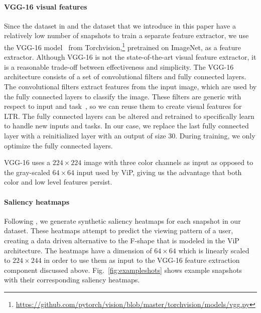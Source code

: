 \paragraph{VGG-16 visual features}
Since the dataset in \citep{fan2017learning} and the \datasetname{} dataset that we introduce in this paper have a relatively low number of snapshots to train a separate feature extractor, we use the VGG-16 model~\cite{simonyan2014very} from Torchvision,\footnote{\url{https://github.com/pytorch/vision/blob/master/torchvision/models/vgg.py}} pretrained on ImageNet, as a feature extractor. 
Although VGG-16 is not the state-of-the-art visual feature extractor, it is a reasonable trade-off between effectiveness and simplicity.
The VGG-16 architecture consists of a set of convolutional filters and fully connected layers. 
The convolutional filters extract features from the input image, which are used by the fully connected layers to classify the image. 
These filters are generic with respect to input and task~\citep{donahue2014decaf}, so we can reuse them to create visual features for LTR. 
The fully connected layers can be altered and retrained to specifically learn to handle new inputs and tasks. 
In our case, we replace the last fully connected layer with a reinitialized layer with an output of size $30$. During training, we only optimize the fully connected layers.

VGG-16 uses a $224\times224$ image with three color channels as input as opposed to the gray-scaled $64\times64$ input used by ViP, giving us the advantage that both color and low level features persist. 


\paragraph{Saliency heatmaps}
Following \cite{shan2017two}, we generate synthetic saliency heatmaps for each snapshot in our data\-set. 
These heatmaps attempt to predict the viewing pattern of a user, creating a data driven alternative to the F-shape that is modeled in the ViP architecture. 
The heatmaps have a dimension of $64\times64$ which is linearly scaled to $224\times244$ in order to use them as input to the VGG-16 feature extraction component discussed above.
Fig.~\ref{fig:exampleshots} shows example snapshots with their corresponding saliency heatmaps.
